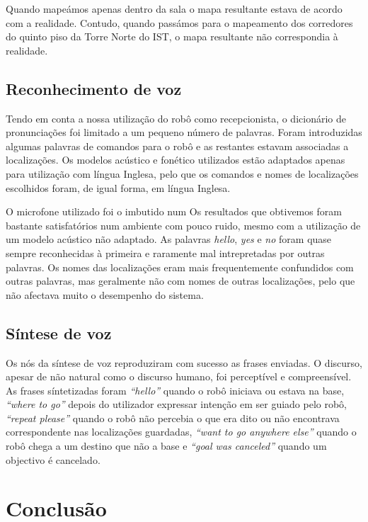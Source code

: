 \documentclass[journal]{IEEEtran}
\begin{document}
Quando mapeámos apenas dentro da sala o mapa resultante estava de acordo com a realidade. Contudo, quando passámos para o mapeamento dos corredores do quinto piso da Torre Norte do IST, o mapa resultante não correspondia à realidade.

\subsection{Reconhecimento de voz}
\label{sec:resuts_recvoice}

Tendo em conta a nossa utilização do robô como recepcionista, o dicionário de pronunciações foi limitado a um pequeno número de palavras. Foram introduzidas algumas palavras de comandos para o robô e as restantes estavam associadas a localizações. Os modelos acústico e fonético utilizados estão adaptados apenas para utilização com língua Inglesa, pelo que os comandos e nomes de localizações escolhidos foram, de igual forma, em língua Inglesa.

O microfone utilizado foi o imbutido num Os resultados que obtivemos foram bastante satisfatórios num ambiente com pouco ruido, mesmo com a utilização de um modelo acústico não adaptado. As palavras \textit{hello}, \textit{yes} e \textit{no} foram quase sempre reconhecidas à primeira e raramente mal intrepretadas por outras palavras. Os nomes das localizações eram mais frequentemente confundidos com outras palavras, mas geralmente não com nomes de outras localizações, pelo que não afectava muito o desempenho do sistema.

\subsection{Síntese de voz}
\label{sec:results_sintvoice}

Os nós da síntese de voz reproduziram com sucesso as frases enviadas. O discurso, apesar de não natural como o discurso humano, foi perceptível e compreensível. As frases síntetizadas foram \textit{``hello''} quando o robô iniciava ou estava na base, \textit{``where to go''} depois do utilizador expressar intenção em ser guiado pelo robô, \textit{``repeat please''} quando o robô não percebia o que era dito ou não encontrava correspondente nas localizações guardadas, \textit{``want to go anywhere else''} quando o robô chega a um destino que não a base e \textit{``goal was canceled''} quando um objectivo é cancelado.



\section{Conclusão}
\end{document}

